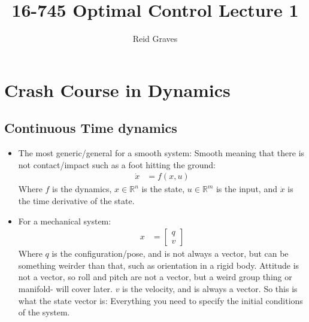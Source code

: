 \documentclass[11pt]{article}
\title{16-745 Optimal Control Lecture 1}
\author{Reid Graves}
\begin{document}
\maketitle

\section{Crash Course in Dynamics}

\subsection{Continuous Time dynamics}
\begin{itemize}
    \item The most generic/general for a smooth system: Smooth meaning that there is not contact/impact such as a foot hitting the ground:
    \begin{align*}
        \dot{x} &= f(x,u) 
    \end{align*}
    Where $f$ is the dynamics, $x\in \mathbb{R}^n$ is the state, $u\in \mathbb{R}^m$ is the input, and $\dot{x}$ is the time derivative of the state.
    \item For a mechanical system:
    \begin{align*}
        x &= \begin{bmatrix}
            q \\
            v
        \end{bmatrix}
    \end{align*}
    Where $q$ is the configuration/pose, and is not always a vector, but can be something weirder than that, such as orientation in a rigid body. Attitude is not a vector, so roll and pitch are not a vector, but a weird group thing or manifold- will cover later. $v$ is the velocity, and is always a vector. So this is what the state vector is: Everything you need to specify the initial conditions of the system. 
\end{itemize}
\end{document}
